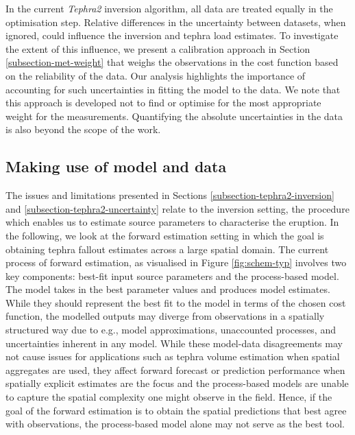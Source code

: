     In the current \textit{Tephra2} inversion algorithm, all data are treated equally in the optimisation step. Relative differences in the uncertainty between datasets, when ignored, could influence the inversion and tephra load estimates. To investigate the extent of this influence, we present a calibration approach in Section \ref{subsection-met-weight} that weighs the observations in the cost function based on the reliability of the data. Our analysis highlights the importance of accounting for such uncertainties in fitting the model to the data. We note that this approach is developed not to find or optimise for the most appropriate weight for the measurements. Quantifying the absolute uncertainties in the data is also beyond the scope of the work.

 
\subsection{Making use of model and data} \label{subsection-tephra2-prediction}

The issues and limitations presented in Sections \ref{subsection-tephra2-inversion} and \ref{subsection-tephra2-uncertainty} relate to the inversion setting, the procedure which enables us to estimate source parameters to characterise the eruption. In the following, we look at the forward estimation setting in which the goal is obtaining tephra fallout estimates across a large spatial domain. The current process of forward estimation, as visualised in Figure \ref{fig:schem-typ} involves two key components: best-fit input source parameters and the process-based model. The model takes in the best parameter values and produces model estimates. While they should represent the best fit to the model in terms of the chosen cost function, the modelled outputs may diverge from observations in a spatially structured way due to e.g., model approximations, unaccounted processes, and uncertainties inherent in any model. While these model-data disagreements may not cause issues for applications such as tephra volume estimation when spatial aggregates are used, they affect forward forecast or prediction performance when spatially explicit estimates are the focus and the process-based models are unable to capture the spatial complexity one might observe in the field. Hence, if the goal of the forward estimation is to obtain the spatial predictions that best agree with observations, the process-based model alone may not serve as the best tool.

